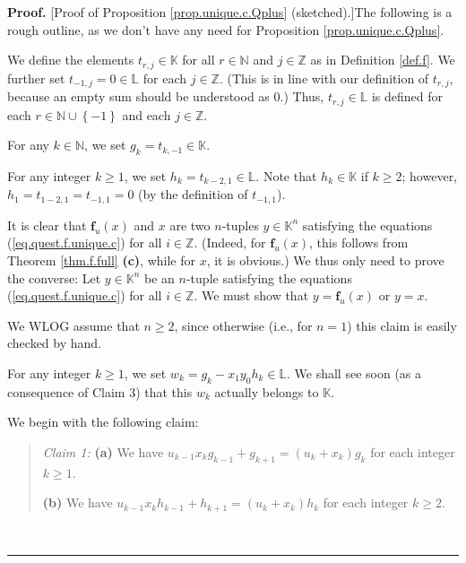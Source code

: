\documentclass[numbers=enddot,12pt,final,onecolumn,notitlepage]{scrartcl}%
\theoremstyle{definition}
\newenvironment{statement}{\begin{quote}}{\end{quote}}
\newenvironment{proof}[1][Proof]{\noindent\textbf{#1.} }{\ \rule{0.5em}{0.5em}}
\newenvironment{verlong}{}{}
\begin{document}
\begin{verlong}
\begin{proof}
[Proof of Proposition \ref{prop.unique.c.Qplus} (sketched).]The following is a
rough outline, as we don't have any need for Proposition
\ref{prop.unique.c.Qplus}.

We define the elements $t_{r,j}\in\mathbb{K}$ for all $r\in\mathbb{N}$ and
$j\in\mathbb{Z}$ as in Definition \ref{def.f}. We further set $t_{-1,j}%
=0\in\mathbb{L}$ for each $j\in\mathbb{Z}$. (This is in line with our
definition of $t_{r,j}$, because an empty sum should be understood as $0$.)
Thus, $t_{r,j}\in\mathbb{L}$ is defined for each $r\in\mathbb{N}\cup\left\{
-1\right\}  $ and each $j\in\mathbb{Z}$.

For any $k\in\mathbb{N}$, we set $g_{k}=t_{k,-1}\in\mathbb{K}$.

For any integer $k\geq1$, we set $h_{k}=t_{k-2,1}\in\mathbb{L}$. Note that
$h_{k}\in\mathbb{K}$ if $k\geq2$; however, $h_{1}=t_{1-2,1}=t_{-1,1}=0$ (by
the definition of $t_{-1,1}$).

It is clear that $\mathbf{f}_{u}\left(  x\right)  $ and $x$ are two $n$-tuples
$y\in\mathbb{K}^{n}$ satisfying the equations (\ref{eq.quest.f.unique.c}) for
all $i\in\mathbb{Z}$. (Indeed, for $\mathbf{f}_{u}\left(  x\right)  $, this
follows from Theorem \ref{thm.f.full} \textbf{(c)}, while for $x$, it is
obvious.) We thus only need to prove the converse: Let $y\in\mathbb{K}^{n}$ be
an $n$-tuple satisfying the equations (\ref{eq.quest.f.unique.c}) for all
$i\in\mathbb{Z}$. We must show that $y=\mathbf{f}_{u}\left(  x\right)  $ or
$y=x$.

We WLOG assume that $n\geq2$, since otherwise (i.e., for $n=1$) this claim is
easily checked by hand.

For any integer $k\geq1$, we set $w_{k}=g_{k}-x_{1}y_{0}h_{k}\in\mathbb{L}$.
We shall see soon (as a consequence of Claim 3) that this $w_{k}$ actually
belongs to $\mathbb{K}$.

We begin with the following claim:

\begin{statement}
\textit{Claim 1:} \textbf{(a)} We have $u_{k-1}x_{k}g_{k-1}+g_{k+1}=\left(
u_{k}+x_{k}\right)  g_{k}$ for each integer $k\geq1$.

\textbf{(b)} We have $u_{k-1}x_{k}h_{k-1}+h_{k+1}=\left(  u_{k}+x_{k}\right)
h_{k}$ for each integer $k\geq2$.
\end{statement}


\end{proof}
\end{verlong}
\end{document}
